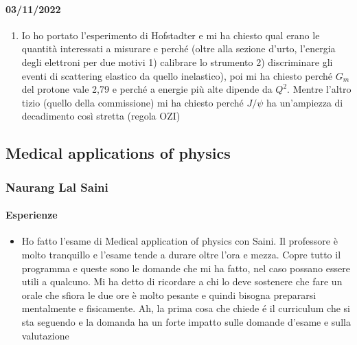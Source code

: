 \documentclass[../main.tex]{subfiles}
\begin{document}
\paragraph{03/11/2022}
\begin{enumerate}
    \item Io ho portato l'esperimento di Hofstadter e mi ha chiesto qual erano le quantità interessati a misurare e perché (oltre alla sezione d'urto, l'energia degli elettroni per due motivi 1) calibrare lo strumento 2) discriminare gli eventi di scattering elastico da quello inelastico), poi mi ha chiesto perché $G_m$ del protone vale 2,79 e perché a energie più alte dipende da $Q^2$. Mentre l'altro tizio (quello della commissione) mi ha chiesto perché $J/\psi$ ha un'ampiezza di decadimento così stretta (regola OZI)
\end{enumerate}
\subsection{Medical applications of physics}
\subsubsection{Naurang Lal Saini}
\paragraph{Esperienze}
\begin{itemize}
    \item  Ho fatto l'esame di Medical application of physics con Saini. Il professore è molto tranquillo e l'esame tende a durare oltre l'ora e mezza. Copre tutto il programma e queste sono le domande che mi ha fatto, nel caso possano essere utili a qualcuno. Mi ha detto di ricordare a chi lo deve sostenere che fare un orale che sfiora le due ore è molto pesante e quindi bisogna prepararsi mentalmente e fisicamente. Ah, la prima cosa che chiede é il curriculum che si sta seguendo e la domanda ha un forte impatto sulle domande d'esame e sulla valutazione
\end{itemize}
\end{document}
